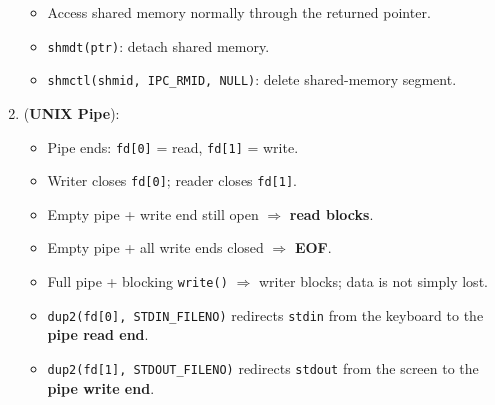 \documentclass[10pt, landscape]{article}
\begin{document}
\begin{multicols}{4}
\begin{enumerate}
\begin{itemize}
\begin{itemize}
        \end{itemize}
        \item Access shared memory normally through the returned pointer.
        \item \texttt{shmdt(ptr)}: detach shared memory.
        \item \texttt{shmctl(shmid, IPC\_RMID, NULL)}: delete shared-memory segment.
    \end{itemize}
    \item (\textbf{UNIX Pipe}):
    \begin{itemize}
        \item Pipe ends: \texttt{fd[0]} = read, \texttt{fd[1]} = write.
        \item Writer closes \texttt{fd[0]}; reader closes \texttt{fd[1]}.
        \item Empty pipe + write end still open $\Rightarrow$ \textbf{read blocks}.
        \item Empty pipe + all write ends closed $\Rightarrow$ \textbf{EOF}.
        \item Full pipe + blocking \texttt{write()} $\Rightarrow$ writer blocks; data is not simply lost.
        \item \texttt{dup2(fd[0], STDIN\_FILENO)} redirects \texttt{stdin} from the keyboard to the \textbf{pipe read end}.
        \item \texttt{dup2(fd[1], STDOUT\_FILENO)} redirects \texttt{stdout} from the screen to the \textbf{pipe write end}.
    \end{itemize}
\end{enumerate}


\end{multicols}
\end{document}
